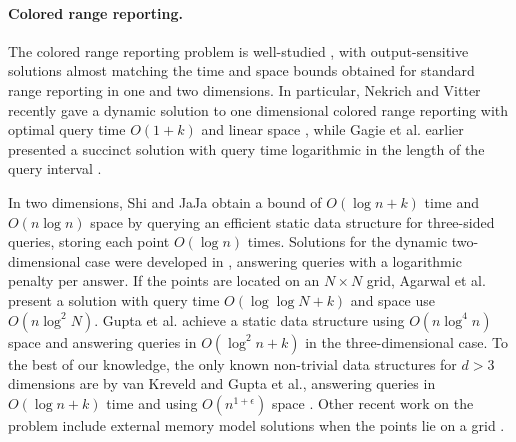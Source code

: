 \paragraph*{Colored range reporting.}
%
The colored range reporting problem is well-studied \cite{janardan1993generalized, nekrich2012space, nekrich2013optimal, nekrich2014efficient, gagie2012colored, shi2005optimal, gupta1995further, gupta1997technique, van1992new, mortensen2003generalized, bozanis1995new, larsen2012efficient}, with output-sensitive solutions almost matching the time and space bounds obtained for standard range reporting in one and two dimensions. In particular, Nekrich and Vitter recently gave a dynamic solution to one dimensional colored range reporting with optimal query time $O(1+k)$ and linear space \cite{nekrich2013optimal}, while Gagie et al. earlier presented a succinct solution with query time logarithmic in the length of the query interval \cite{gagie2012colored}.

In two dimensions, Shi and JaJa obtain a bound of $O(\log n + k)$ time and $O(n \log n)$ space \cite{shi2005optimal} by querying an efficient static data structure for three-sided queries, storing each point $O(\log n)$ times. Solutions for the dynamic two-dimensional case were developed in \cite{gupta1995further, bozanis1995new}, answering queries with a logarithmic penalty per answer. If the points are located on an $N \times N$ grid, Agarwal et al. \cite{agarwal2002range} present a solution with query time $O(\log \log N + k)$ and space use $O(n \log ^2 N)$. Gupta et al. achieve a static data structure using $O(n \log ^4 n)$ space and answering queries in $O(\log ^2 n + k)$ \cite{gupta1995further} in the three-dimensional case. To the best of our knowledge, the only known non-trivial data structures for $d> 3$ dimensions are by van Kreveld and Gupta et al., answering queries in $O(\log n + k)$ time and using $O(n^{1+\epsilon})$ space \cite{van1992new, gupta1997technique}. Other recent work on the problem include external memory model solutions when the points lie on a grid \cite{nekrich2012space, larsen2012efficient, nekrich2014efficient}.



